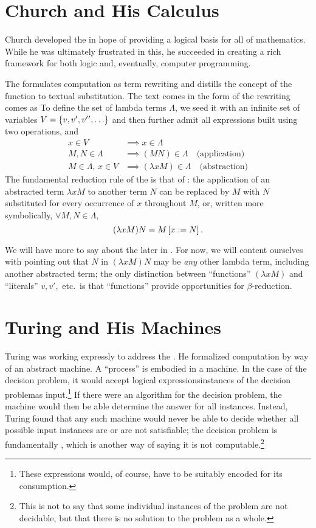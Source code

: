 \section{Church and His Calculus}
Church developed the \lambdacalc in hope of providing a logical basis for all of mathematics. While he was ultimately frustrated in this, he succeeded in creating a rich framework for both logic and, eventually, computer programming.

The \lambdacalc formulates computation as term rewriting and distills the concept of the function to textual substitution. The text comes in the form of  the rewriting comes as  To define the set of lambda terms $\Lambda$, we seed it with an infinite set of variables $V = \set{v, v\prime, v\prime\prime, \dotsc}$ and then further admit all expressions built using two operations,  and 
\begin{align*}
x \in V &\implies x \in \Lambda\\
M,N \in \Lambda &\implies (MN) \in \Lambda \quad\text{(application)}\\
M \in \Lambda,\, x \in V &\implies (\lambda x M) \in \Lambda \quad\text{(abstraction)}
\end{align*}
The fundamental reduction rule of the \lambdacalc is that of : the application of an abstracted term $\lambda x M$ to another term $N$ can be replaced by $M$ with $N$ substituted for every occurrence of $x$ throughout $M$, or, written more symbolically, $\forall M,N \in \Lambda,$
\[
(\lambda x M)N = \replace{x}{N}{M}.
\]

We will have more to say about the \lambdacalc later in . For now, we will content ourselves with pointing out that $N$ in $(\lambda x M)N$ may be \emph{any} other lambda term, including another abstracted term; the only distinction between ``functions'' $(\lambda x M)$ and ``literals'' $v, v\prime,$ etc.\ is that ``functions'' provide opportunities for $\beta$-reduction.

\section{Turing and His Machines}
Turing was working expressly to address the . He formalized computation by way of an abstract machine. A ``process'' is embodied in a machine. In the case of the decision problem, it would accept logical expressions\empause instances of the decision problem\empause as input.\footnote{These expressions would, of course, have to be suitably encoded for its consumption.} If there were an algorithm for the decision problem, the machine would then be able determine the answer for all instances. Instead, Turing found that any such machine would never be able to decide whether all possible input instances are or are not satisfiable; the decision problem is fundamentally , which is another way of saying it is not computable.\footnote{This is not to say that some individual instances of the problem are not decidable, but that there is no solution to the problem as a whole.}

